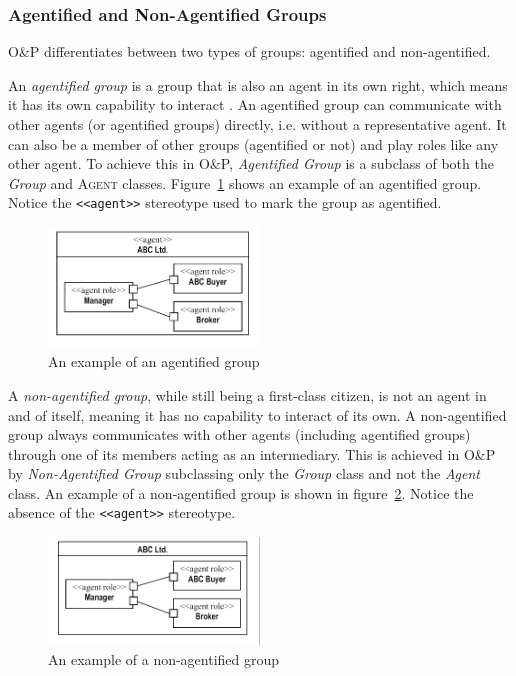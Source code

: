 \subsubsection*{Agentified and Non-Agentified Groups}

O\&P differentiates between two types of groups: agentified and non-agentified.

An \textit{agentified group} is a group that is also an agent in its own right, which means it has its own capability to interact \cite{Odell05}.
An agentified group can communicate with other agents (or agentified groups) directly, i.e. without a representative agent.
It can also be a member of other groups (agentified or not) and play roles like any other agent.
To achieve this in O\&P, \textit{Agentified Group} is a subclass of both the \textit{Group} and \textsc{Agent} classes.
Figure~\ref{figure:onp-agentified-group} shows an example of an agentified group.
Notice the \texttt{<<agent>>} stereotype used to mark the group as agentified.

\begin{figure}[ht]
	\centering
	\includegraphics[width=0.5\textwidth]{images/onp/agentified-group.png}
	\caption{An example of an agentified group}
	\label{figure:onp-agentified-group}
\end{figure}

A \textit{non-agentified group}, while still being a first-class citizen, is not an agent in and of itself, meaning it has no capability to interact of its own.
A non-agentified group always communicates with other agents (including agentified groups) through one of its members acting as an intermediary.
This is achieved in O\&P by \textit{Non-Agentified Group} subclassing only the \textit{Group} class and not the \textit{Agent} class.
An example of a non-agentified group is shown in figure~\ref{figure:onp-non-agentified-group}.
Notice the absence of the \texttt{<<agent>>} stereotype.

\begin{figure}[ht]
	\centering
	\includegraphics[width=0.5\textwidth]{images/onp/non-agentified-group.png}
	\caption{An example of a non-agentified group}
	\label{figure:onp-non-agentified-group}
\end{figure}

